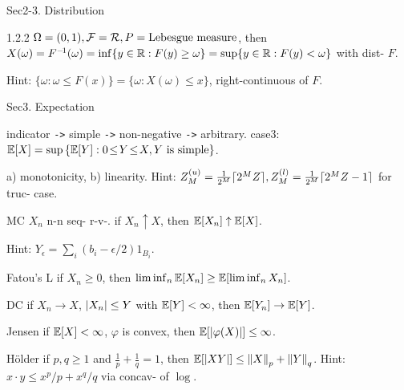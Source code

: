 Sec2-3. Distribution \hrulefill

\begin{thm}{1.2.2} 
    $\Omega = (0, 1), \cF = \cR, P = \text{Lebesgue measure}$, then 
    $X(\omega) = \inv{F}(\omega) = \inf\{y \in \bR: F(y) \geq \omega\} = \sup\{y \in \bR: F(y) < \omega\}$ with dist- $F$.
    
    Hint: $\{\omega: \omega \leq F(x)\} = \{\omega: X(\omega) \leq x\}$, right-continuous of $F$.
\end{thm}

Sec3. Expectation \hrulefill

\begin{defi}
    indicator \verb|->| simple \verb|->| non-negative \verb|->| arbitrary.
    \newline case3: $\bE{X} = \sup \left\{\bE{Y}: 0 \!\leq\! Y \!\leq\! X, Y \text{ is simple} \right\}$.
\end{defi}

\begin{prop}
    a) monotonicity, b) linearity.
    \newline Hint: $Z_M^{(u)} = \frac{1}{2^{M}} \ceil{ 2^MZ }, Z_M^{(l)} = \frac{1}{2^{M}} \ceil{ 2^MZ -1 }$ for truc- case.
\end{prop}

\begin{thm}{MC}
    $X_n$ n-n seq- r-v-. if $X_n \uparrow X$, then $\bE{X_n} \uparrow \bE{X}$.
    
    Hint: $Y_\epsilon = \sum_i (b_i - \epsilon/2) 1_{B_i}$.
\end{thm}

\begin{thm}{Fatou's L}
    if $X_n \geq 0$, then $\lim\inf_n \bE{X_n} \geq \bE{\lim\inf_n X_n}$.
\end{thm}

\begin{thm}{DC}
    if $X_n \rightarrow X$, $\abs{X_n} \leq Y$ with $\bE{Y} < \infty$, then $\bE{Y_n} \rightarrow \bE{Y}$.
\end{thm}

\begin{thm}{Jensen}
    if $\bE{X} < \infty$, $\varphi$ is convex, then $\bE{\abs{\varphi(X)}} \leq \infty$.
\end{thm}

\begin{thm}{Hölder}
    if $p, q \geq 1$ and $\frac{1}{p} + \frac{1}{q} = 1$, then $\bE{\abs{XY}} \leq \norm{p}{X} + \norm{q}{Y}$.
    Hint: $x \cdot y \leq x^p / p + x^q / q$ via concav- of $\log$.
\end{thm}

